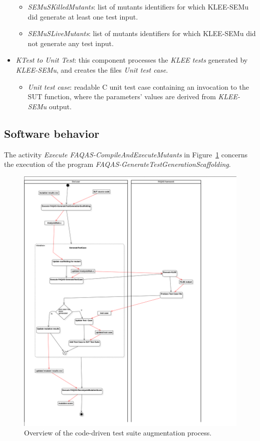\begin{itemize}
\begin{itemize}
    \item \emph{SEMuSKilledMutants}: list of mutants identifiers for which KLEE-SEMu did generate at least one test input.
    \item \emph{SEMuSLiveMutants}: list of mutants identifiers for which KLEE-SEMu did not generate any test input.
  \end{itemize}
  \item \emph{KTest to Unit Test}: this component processes the \emph{KLEE tests} generated by \emph{KLEE-SEMu}, and creates the files \emph{Unit test case}.
  \begin{itemize}
    \item \emph{Unit test case}: readable C unit test case containing an invocation to the SUT function, where the parameters' values are derived from \emph{KLEE-SEMu} output.
  \end{itemize}
\end{itemize}


\subsection{Software behavior}


The activity \emph{Execute FAQAS-CompileAndExecuteMutants} in Figure~\ref{fig:process:codeDriven:augmentation} concerns the execution of the program \emph{FAQAS-GenerateTestGenerationScaffolding}.

\begin{figure}[h]
  \centering
  \includegraphics[width=\textwidth]{images/png/Activity1!CodeDrivenTestSuiteAugmentation_2.png}
      \caption{Overview of the code-driven test suite augmentation process.}
      \label{fig:process:codeDriven:augmentation}
\end{figure}

